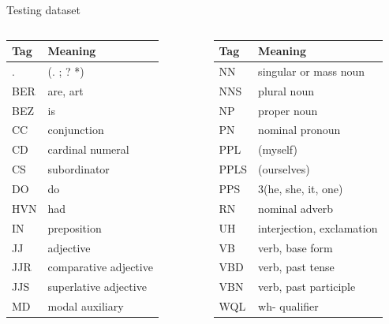 \documentclass[10pt]{beamer}
\begin{document}
\begin{frame}[fragile]{Testing dataset}
\centering
\begin{columns}
  \begin{tabular}{l l}
    Tag & Meaning \\
    \hline
    . & (. ; ? *) \\
    BER & are, art \\
    BEZ & is \\
    CC &  conjunction  \\
    CD &  cardinal numeral  \\
    CS &  subordinator \\
    DO &  do \\
    HVN & had  \\
    IN &  preposition \\
    JJ &  adjective \\
    JJR & comparative adjective \\
    JJS & superlative adjective \\
    MD &  modal auxiliary  \\
  \end{tabular}
  \begin{tabular}{l l}
    Tag & Meaning \\
    \hline
    NN &  singular or mass noun \\
    NNS & plural noun \\
    NP &  proper noun \\
    PN &  nominal pronoun  \\
    PPL &  (myself) \\
    PPLS &  (ourselves) \\
    PPS & 3(he, she, it, one) \\
    RN &  nominal adverb \\
    UH &  interjection, exclamation \\
    VB &  verb, base form \\
    VBD & verb, past tense \\
    VBN & verb, past participle \\
    WQL & wh- qualifier \\
  \end{tabular}



\end{columns}
\end{frame}
\end{document}
